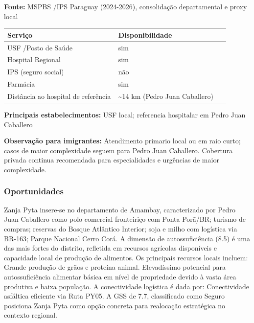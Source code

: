 \textbf{Fonte:} MSPBS /\allowbreak  IPS Paraguay (2024-2026), consolidação
departamental e proxy local

{\def\LTcaptype{none} %
\begin{longtable}{@{}>{\raggedright\arraybackslash}p{0.45\linewidth} >{\raggedright\arraybackslash}p{0.45\linewidth}@{}}
\toprule\noalign{}
Serviço & Disponibilidade \\
\midrule\noalign{}
\endhead
\bottomrule\noalign{}
\endlastfoot
USF /\allowbreak  Posto de Saúde & sim \\
Hospital Regional & sim \\
IPS (seguro social) & não \\
Farmácia & sim \\
Distância ao hospital de referência & \textasciitilde14 km (Pedro Juan
Caballero) \\
\end{longtable}
}

\textbf{Principais estabelecimentos:} USF local; referencia hospitalar
em Pedro Juan Caballero

\textbf{Observação para imigrantes:} Atendimento primario local ou em
raio curto; casos de maior complexidade seguem para Pedro Juan
Caballero. Cobertura privada continua recomendada para especialidades e
urgências de maior complexidade.

\subsubsection*{Oportunidades}\label{oport-zanja-pyta-1304}
Zanja Pyta insere-se no departamento de Amambay, caracterizado por Pedro Juan Caballero como polo comercial fronteiriço com Ponta Porã/BR; turismo de compras; reservas do Bosque Atlântico Interior; soja e milho com logística via BR-163; Parque Nacional Cerro Corá. A dimensão de autossuficiência (8.5) é uma das mais fortes do distrito, refletida em recursos agrícolas disponíveis e capacidade local de produção de alimentos. Os principais recursos locais incluem: Grande produção de grãos e proteína animal. Elevadíssimo potencial para autossuficiência alimentar básica em nível de propriedade devido à vasta área produtiva e baixa população. A conectividade logística é dada por: Conectividade asfáltica eficiente via Ruta PY05. A GSS de 7.7, classificado como Seguro posiciona Zanja Pyta como opção concreta para realocação estratégica no contexto regional.

